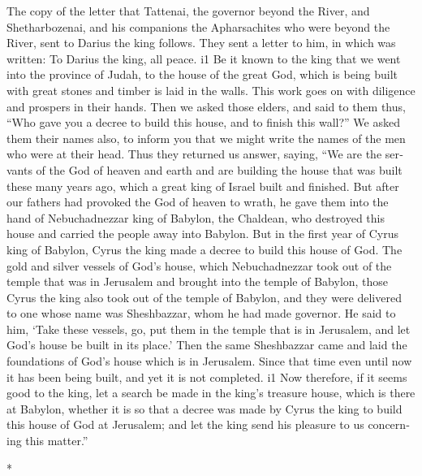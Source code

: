 \begin{paracol}{2}
\begin{otherlanguage}{english}
 The copy of the letter that Tattenai, the governor beyond
the River, and Shetharbozenai, and his companions the Apharsachites who
were beyond the River, sent to Darius the king follows. 
They sent a letter to him, in which was written: To Darius the king, all
peace. i1  Be it known to the king that we went into the
province of Judah, to the house of the great God, which is being built
with great stones and timber is laid in the walls. This work goes on
with diligence and prospers in their hands.  Then we asked
those elders, and said to them thus, ``Who gave you a decree to build
this house, and to finish this wall?''  We asked them
their names also, to inform you that we might write the names of the men
who were at their head.  Thus they returned us answer,
saying, ``We are the servants of the God of heaven and earth and are
building the house that was built these many years ago, which a great
king of Israel built and finished.  But after our fathers
had provoked the God of heaven to wrath, he gave them into the hand of
Nebuchadnezzar king of Babylon, the Chaldean, who destroyed this house
and carried the people away into Babylon.  But in the
first year of Cyrus king of Babylon, Cyrus the king made a decree to
build this house of God.  The gold and silver vessels of
God's house, which Nebuchadnezzar took out of the temple that was in
Jerusalem and brought into the temple of Babylon, those Cyrus the king
also took out of the temple of Babylon, and they were delivered to one
whose name was Sheshbazzar, whom he had made governor. 
He said to him, `Take these vessels, go, put them in the temple that is
in Jerusalem, and let God's house be built in its place.'
 Then the same Sheshbazzar came and laid the foundations
of God's house which is in Jerusalem. Since that time even until now it
has been being built, and yet it is not completed. i1 
Now therefore, if it seems good to the king, let a search be made in the
king's treasure house, which is there at Babylon, whether it is so that
a decree was made by Cyrus the king to build this house of God at
Jerusalem; and let the king send his pleasure to us concerning this
matter.''

\end{otherlanguage}

\switchcolumn[0]*

\hypertarget{encontrar-el-decreto-de-cyrus-en-ekbatana-e-informaciuxf3n-de-uxe9l}{%
}
\end{paracol}
